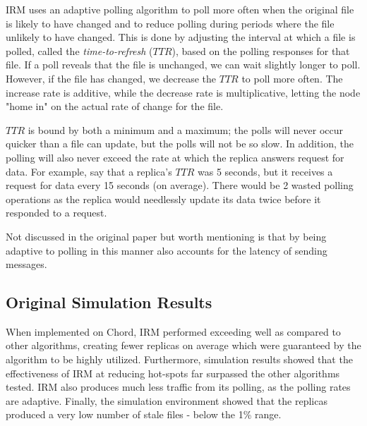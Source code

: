 \documentclass[10pt, conference, compsocconf, letterpaper]{IEEEtran} %
\begin{document}
IRM uses an adaptive polling algorithm to poll more often when the original file is likely to have changed and to reduce polling during periods where the file unlikely to have changed.  This is done by adjusting the interval at which a file is polled, called the \textit{time-to-refresh} ($TTR$), based on the polling responses for that file.  If a poll reveals that the file is unchanged, we can wait slightly longer to poll.  However, if the file has changed, we decrease the $TTR$ to poll more often.   The increase rate is additive, while the decrease rate is multiplicative, letting the node "home in" on the actual rate of change for the file. 

$TTR$ is bound by both a minimum and a maximum; the polls will never occur quicker than a file can update, but the polls will not be so slow. In addition, the polling will also never exceed the rate at which the replica answers request for data.  For example, say that a replica's $TTR$ was 5 seconds, but it receives a request for data every 15 seconds (on average).  There would be 2 wasted polling operations as the replica would needlessly update its data twice before it responded to a request.

Not discussed in the original paper but worth mentioning is that by being adaptive to polling in this manner also accounts for the latency of sending messages.




\subsection{Original Simulation Results}
When implemented on Chord, IRM performed exceeding well as compared to other algorithms, creating fewer replicas on average which were guaranteed by the algorithm to be highly utilized.  Furthermore, simulation results showed that the effectiveness of IRM at reducing hot-spots far surpassed the other algorithms tested.  IRM also produces much less traffic from its polling, as the polling rates are adaptive.  Finally, the simulation environment showed that the replicas produced a very low number of stale files -  below the 1\% range.


\end{document}

